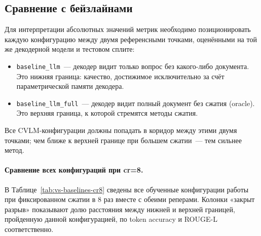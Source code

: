 \documentclass[a4paper,12pt]{extarticle}
\begin{document}
\subsection{Сравнение с бейзлайнами}\label{sec:baselines}

Для интерпретации абсолютных значений метрик необходимо позиционировать каждую конфигурацию между двумя референсными точками, оценёнными на той же декодерной модели и тестовом сплите:

\begin{itemize}
    \item \texttt{baseline\_llm}~--- декодер видит только вопрос без какого-либо документа. Это нижняя граница: качество, достижимое исключительно за счёт параметрической памяти декодера.
    \item \texttt{baseline\_llm\_full}~--- декодер видит полный документ без сжатия (oracle). Это верхняя граница, к которой стремятся методы сжатия.
\end{itemize}

Все CVLM-конфигурации должны попадать в коридор между этими двумя точками; чем ближе к верхней границе при большем сжатии~--- тем сильнее метод.

\paragraph{Сравнение всех конфигураций при cr=8.} В Таблице~\ref{tab:vs-baselines-cr8} сведены все обученные конфигурации работы при фиксированном сжатии в 8 раз вместе с обеими реперами. Колонки «закрыт разрыв» показывают долю расстояния между нижней и верхней границей, пройденную данной конфигурацией, по token accuracy и ROUGE-L соответственно.
\end{document}
